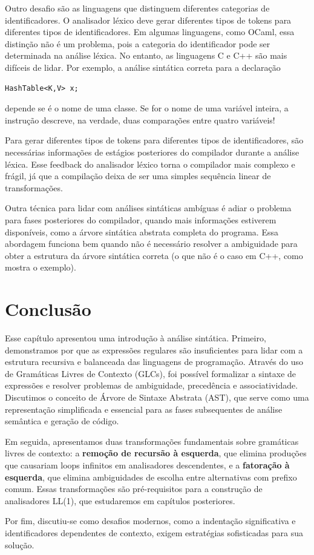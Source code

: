   Outro desafio são as linguagens que distinguem diferentes categorias
  de identificadores. O analisador léxico deve gerar diferentes tipos
  de tokens para diferentes tipos de identificadores. Em algumas
  linguagens, como OCaml, essa distinção não é um problema, pois a
  categoria do identificador pode ser determinada na análise léxica. No
  entanto, as linguagens C e C++ são mais difíceis de lidar. Por
  exemplo, a análise sintática correta para a declaração

\begin{verbatim}
HashTable<K,V> x;
\end{verbatim}

  depende se  é o nome de uma
  classe. Se for o nome de uma variável inteira, a instrução descreve,
  na verdade, duas comparações entre quatro variáveis!

  Para gerar diferentes tipos de tokens para diferentes tipos de
  identificadores, são necessárias informações de estágios posteriores
  do compilador durante a análise léxica. Esse feedback do analisador
  léxico torna o compilador mais complexo e frágil, já que a compilação
  deixa de ser uma simples sequência linear de transformações.

  Outra técnica para lidar com análises sintáticas ambíguas é adiar o
  problema para fases posteriores do compilador, quando mais
  informações estiverem disponíveis, como a árvore sintática abstrata
  completa do programa. Essa abordagem funciona bem quando não é
  necessário resolver a ambiguidade para obter a estrutura da árvore
  sintática correta (o que não é o caso em C++, como mostra o exemplo).

  \section{Conclusão}

  Esse capítulo apresentou uma introdução à análise sintática.
  Primeiro, demonstramos por que as expressões regulares são
  insuficientes para lidar com a estrutura recursiva e balanceada das
  linguagens de programação. Através do uso de Gramáticas Livres de
  Contexto (GLCs), foi possível formalizar a sintaxe de expressões e
  resolver problemas de ambiguidade, precedência e associatividade.
  Discutimos o conceito de Árvore de Sintaxe Abstrata (AST), que serve
  como uma representação simplificada e essencial para as fases
  subsequentes de análise semântica e geração de código.

  Em seguida, apresentamos duas transformações fundamentais sobre
  gramáticas livres de contexto: a \textbf{remoção de recursão à
  esquerda}, que elimina produções que causariam loops infinitos em
  analisadores descendentes, e a \textbf{fatoração à esquerda}, que
  elimina ambiguidades de escolha entre alternativas com prefixo comum.
  Essas transformações são pré-requisitos para a construção de
  analisadores LL(1), que estudaremos em capítulos posteriores.

  Por fim, discutiu-se como desafios modernos, como a indentação
  significativa e identificadores dependentes de contexto, exigem
  estratégias sofisticadas para sua solução.
